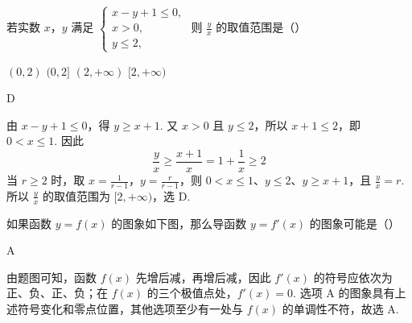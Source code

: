 \begin{problem}
若实数 \(x\)，\(y\) 满足 \(\begin{cases}
x - y + 1 \leqslant 0,\\
x > 0,\\
y \leqslant 2,
\end{cases}\) 则 \(\frac{y}{x}\) 的取值范围是（\quad）

\choices
    {\((0,2)\)}
    {\((0,2]\)}
    {\((2, +\infty)\)}
    {\([2, +\infty)\)}

\begin{answer}
D
\end{answer}

\begin{solution}
由 \(x-y+1\leqslant0\)，得 \(y\geqslant x+1\). 又 \(x>0\) 且 \(y\leqslant2\)，所以 \(x+1\leqslant2\)，即 \(0<x\leqslant1\). 因此
\[
\frac yx\geqslant\frac{x+1}{x}=1+\frac1x\geqslant2
\]
当 \(r\geqslant2\) 时，取 \(x=\frac1{r-1}\)，\(y=\frac r{r-1}\)，则 \(0<x\leqslant1\)、\(y\leqslant2\)、\(y\geqslant x+1\)，且 \(\frac yx=r\). 所以 \(\frac yx\) 的取值范围为 \([2,+\infty)\)，选 D.
\end{solution}
\end{problem}

\begin{problem}
如果函数 \(y = f(x)\) 的图象如下图，那么导函数 \(y = f'(x)\) 的图象可能是（\quad）


    {}
    {}
    {}

\begin{answer}
A
\end{answer}

\begin{solution}
由题图可知，函数 \(f(x)\) 先增后减，再增后减，因此 \(f'(x)\) 的符号应依次为正、负、正、负；在 \(f(x)\) 的三个极值点处，\(f'(x)=0\). 选项 A 的图象具有上述符号变化和零点位置，其他选项至少有一处与 \(f(x)\) 的单调性不符，故选 A.
\end{solution}
\end{problem}

